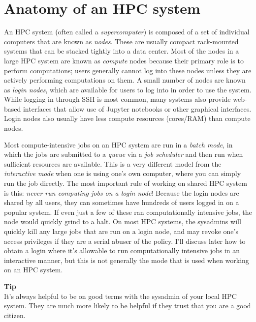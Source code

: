 \section{Anatomy of an HPC system}

An HPC system (often called a \textit{supercomputer}) is composed of a set of individual computers that are known as \textit{nodes}.  These are usually compact rack-mounted systems that can be stacked tightly into a data center.  Most of the nodes in a large HPC system are known as \textit{compute} nodes because their primary role is to perform computations; users generally cannot log into these nodes unless they are actively performing computations on them.  A small number of nodes are known as \textit{login nodes}, which are available for users to log into in order to use the system. While logging in through SSH is most common, many systems also provide web-based interfaces that allow use of Jupyter notebooks or other graphical interfaces.  Login nodes also usually have less compute resources (cores/RAM) than compute nodes.

Most compute-intensive jobs on an HPC system are run in a \textit{batch mode}, in which the jobs are submitted to a \textit{queue} via a \textit{job scheduler} and then run when sufficient resources are available. This is a very different model from the \textit{interactive mode} when one is using one's own computer, where you can simply run the job directly.  The most important rule of working on shared HPC system is this: \textit{never run computing jobs on a login node}!  Because the login nodes are shared by all users, they can sometimes have hundreds of users logged in on a popular system. If even just a few of these ran computationally intensive jobs, the node would quickly grind to a halt. On most HPC systems, the sysadmins will quickly kill any large jobs that are run on a login node, and may revoke one's access privileges if they are a serial abuser of the policy. I'll discuss later how to obtain a login where it's allowable to run computationally intensive jobs in an interactive manner, but this is not generally the mode that is used when working on an HPC system.

\begin{framed}
\textbf{Tip}\\
It's always helpful to be on good terms with the sysadmin of your local HPC system. They are much more likely to be helpful if they trust that you are a good citizen.
\end{framed}

